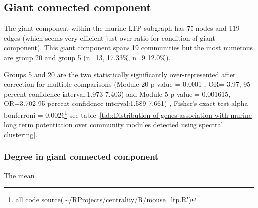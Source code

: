 \subsection{Giant connected component}

The giant component within the murine LTP subgraph has 75 nodes and 119 edges (which seems very efficient just over ratio for condition of giant component). This giant component spans 19 communities but the most numerous are group 20 and group 5 (n=13, 17.33\%, n=9 12.0\%).

Groups 5 and 20 are the two statistically significantly over-represented after correction for multiple comparisons (Module 20 p-value = 0.0001 , OR= 3.97, 95 percent confidence interval:1.973 7.403) and Module 5
p-value = 0.001615, OR=3.702 95 percent confidence interval:1.589 7.661) , Fisher's exact test alpha bonferroni = 0.0026\footnote{all code \url{source('~/RProjects/centrality/R/mouse_ltp.R')}} see table~\ref{tab:Distribution of genes association with murine long term potentiation over community modules detected using spectral clustering}.

\subsubsection{Degree in giant connected component}
The mean 


